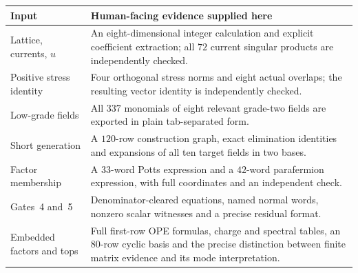 \documentclass[11pt]{article}
\theoremstyle{remark}\newtheorem{remark}[proposition]{Remark}
\begin{document}
\begin{center}\small
\begin{tabular}{@{}P{.25\linewidth}P{.65\linewidth}@{}}
\toprule Input & Human-facing evidence supplied here\\\midrule
Lattice, currents, $u$ & An eight-dimensional integer calculation and
explicit coefficient extraction; all $72$ current singular products
are independently checked.\\
Positive stress identity & Four orthogonal stress norms and eight actual
overlaps; the resulting vector identity is independently checked.\\
Low-grade fields & All $337$ monomials of eight relevant grade-two fields
are exported in plain tab-separated form.\\
Short generation & A $120$-row construction graph, exact elimination
identities and expansions of all ten target fields in two bases.\\
Factor membership & A $33$-word Potts expression and a $42$-word
parafermion expression, with full coordinates and an independent check.\\
Gates~4 and~5 & Denominator-cleared equations, named normal words,
nonzero scalar witnesses and a precise residual format.\\
Embedded factors and tops & Full first-row OPE formulas, charge and
spectral tables, an $80$-row cyclic basis and the precise distinction
between finite matrix evidence and its mode interpretation.\\
\bottomrule
\end{tabular}\end{center}
\end{document}
